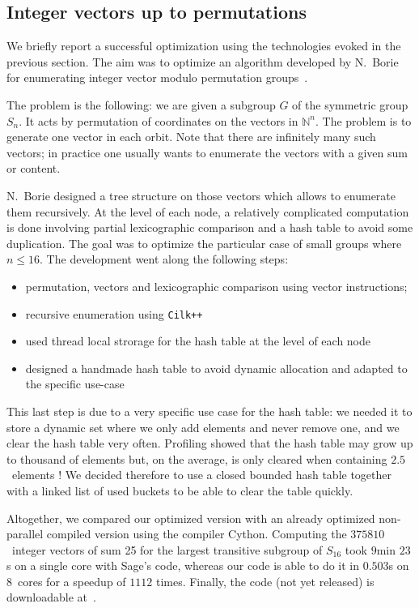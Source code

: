 \documentclass{deliverablereport}
\newcommand{\CilkP}{\texttt{Cilk++}\xspace}
\newcommand{\NN}{\mathbb{N}}
\begin{document}
\subsection{Integer vectors up to permutations}
\label{subec:integer:vectors}

We briefly report a successful optimization using the technologies
evoked in the previous section. The aim was to optimize an algorithm
developed by N.~Borie for enumerating integer vector modulo permutation
groups~\cite{Borie}.

The problem is the following: we are given a subgroup $G$ of the symmetric
group $S_n$. It acts by permutation of coordinates on the vectors in $\NN^n$.
The problem is to generate one vector in each orbit. Note that there are
infinitely many such vectors; in practice one usually wants to enumerate the
vectors with a given sum or content. 

N.~Borie designed a tree structure on those vectors which allows to enumerate
them recursively. At the level of each node, a relatively complicated
computation is done involving partial lexicographic comparison and a hash
table to avoid some duplication. The goal was to optimize the particular case
of small groups where $n\leq16$. The development went along the following
steps:
\begin{itemize}
\item permutation, vectors and lexicographic comparison using vector
  instructions;
\item recursive enumeration using \CilkP
\item used thread local strorage for the hash table at the level of each node
\item designed a handmade hash table to avoid dynamic allocation and adapted
  to the specific use-case
\end{itemize}
This last step is due to a very specific use case for the hash table: we
needed it to store a dynamic set where we only add elements and never remove
one, and we clear the hash table very often. Profiling showed that the hash
table may grow up to thousand of elements but, on the average, is
only cleared when containing $2.5$~elements ! We decided therefore to use a
closed bounded hash table together with a linked list of used buckets to be
able to clear the table quickly.

Altogether, we compared our optimized version with an already optimized
non-parallel compiled version using the \Python compiler Cython. Computing the
$375810$~integer vectors of sum 25 for the largest transitive subgroup of
$S_{16}$ took $9$min $23$s on a single core with Sage's code, whereas our code
is able to do it in $0.503$s on $8$~cores for a speedup of $1112$ times.
Finally, the code (not yet released) is downloadable at~\cite{IVMPG}.
\end{document}
